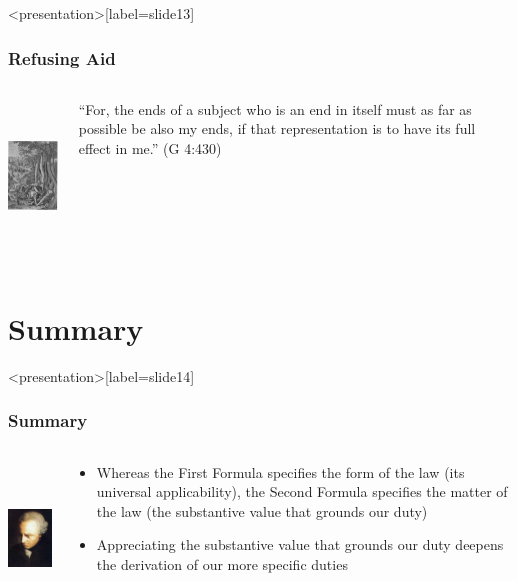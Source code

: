 \begin{frame}<presentation>[label=slide13]
    \frametitle{Refusing Aid}
        \begin{columns}
            \begin{column}{3cm}
                \includegraphics[height=4cm]{../../../graphics/samaritan.jpg}
            \end{column}
            \begin{column}{7cm}
                ``For, the ends of a subject who is an end in itself must as far as possible be also my ends, if that representation is to have its full effect in me.'' (G 4:430) 
            \end{column}
        \end{columns}
\end{frame}


\section{Summary}

\begin{frame}<presentation>[label=slide14]
    \frametitle{Summary}
        \begin{columns}
            \begin{column}{3cm}
                \includegraphics[height=4cm]{../../../graphics/kant.jpg}
            \end{column}
            \begin{column}{7cm}
                \begin{itemize}
                    \item Whereas the First Formula specifies the form of the law (its universal applicability), the Second Formula specifies the matter of the law (the substantive value that grounds our duty)
                    \item Appreciating the substantive value that grounds our duty deepens the derivation of our more specific duties
                \end{itemize}
            \end{column}
        \end{columns}
\end{frame}



